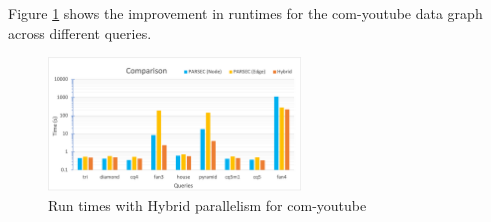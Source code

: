 Figure \ref{fig:hybrid-par-speedups} shows the improvement in runtimes for the com-youtube data graph across different queries.

\begin{figure}[h]
    \centering
    \includegraphics[width=0.6\textwidth]{fig/improvements/Hybrid-parallelism-speedups.png}
    \caption{Run times with Hybrid parallelism for com-youtube}
    \label{fig:hybrid-par-speedups}
\end{figure}
